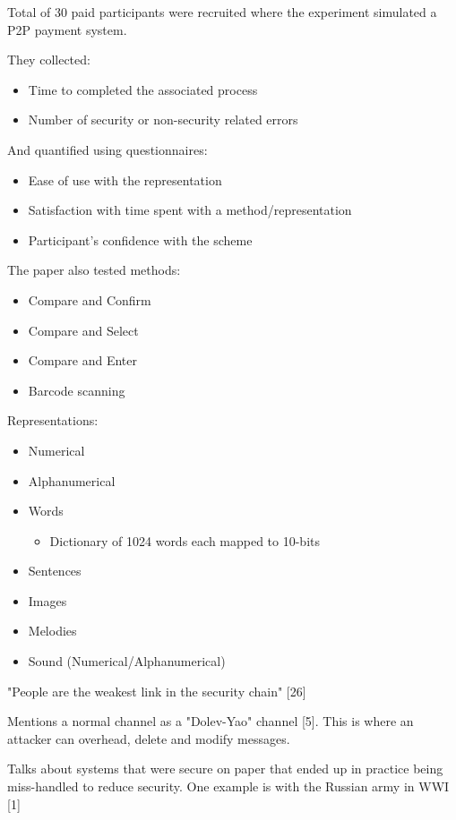 Total of 30 paid participants were recruited where the experiment simulated a P2P payment system.

They collected:
\begin{itemize}
    \item Time to completed the associated process
    \item Number of security or non-security related errors
\end{itemize}

And quantified using questionnaires:
\begin{itemize}
    \item Ease of use with the representation
    \item Satisfaction with time spent with a method/representation
    \item Participant's confidence with the scheme
\end{itemize}

The paper also tested methods:
\begin{itemize}
    \item Compare and Confirm
    \item Compare and Select
    \item Compare and Enter
    \item Barcode scanning
\end{itemize}

Representations:
\begin{itemize}
    \item Numerical
    \item Alphanumerical
    \item Words
    \begin{itemize}
        \item Dictionary of 1024 words each mapped to 10-bits
    \end{itemize}
    \item Sentences
    \item Images
    \item Melodies
    \item Sound (Numerical/Alphanumerical)
\end{itemize}

"People are the weakest link in the security chain" [26]

Mentions a normal channel as a "Dolev-Yao" channel [5]. This is where an attacker can overhead, delete and modify messages.

Talks about systems that were secure on paper that ended up in practice being miss-handled to reduce security. One example is with the Russian army in WWI [1]

